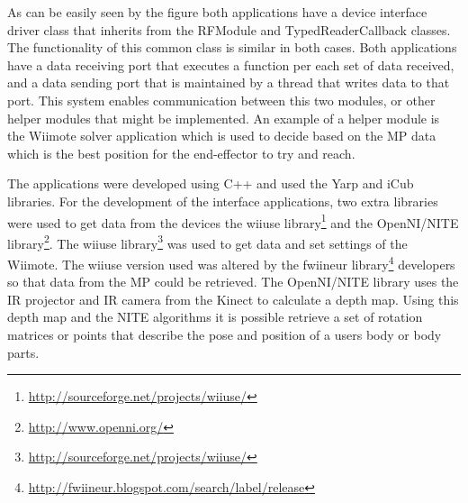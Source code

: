 	As can be easily seen by the figure both applications have a device interface driver class that inherits from the RFModule and TypedReaderCallback classes. The functionality of this common class is similar in both cases. Both applications have a data receiving port that executes a function per each set of data received, and a data sending port that is maintained by a thread that writes data to that port. This system enables communication between this two modules, or other helper modules that might be implemented. An example of a helper module is the \ac{Wiimote} solver application which is used to decide based on the \ac{MP} data which is the best position for the end-effector to try and reach.
	
	The applications were developed using C++ and used the \ac{Yarp} and iCub libraries. For the development of the interface applications, two extra libraries were used to get data from the devices the wiiuse library\footnote{\url{http://sourceforge.net/projects/wiiuse/}} and the OpenNI/NITE library\footnote{\url{http://www.openni.org/}}. The wiiuse library\footnote{\url{http://sourceforge.net/projects/wiiuse/}} was used to get data and set settings of the \ac{Wiimote}. The wiiuse version used was altered by the fwiineur library\footnote{\url{http://fwiineur.blogspot.com/search/label/release}} developers so that data from the \ac{MP} could be retrieved. The OpenNI/NITE library uses the \ac{IR} projector and \ac{IR} camera from the Kinect to calculate a depth map. Using this depth map and the NITE algorithms it is possible retrieve a set of rotation matrices or points that describe the pose and position of a users body or body parts.